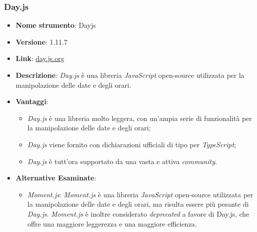 \subsubsection{Day.js}
\begin{itemize}
    \item \textbf{Nome strumento}: Dayjs
    \item \textbf{Versione}: 1.11.7
    \item \textbf{Link}: \href{https://day.js.org/}{day.js.org}
    \item \textbf{Descrizione}: \textit{Day.js} è una libreria \textit{JavaScript} open-source utilizzata per la manipolazione delle date e degli orari.
    \item \textbf{Vantaggi}:
          \begin{itemize}
              \item \textit{Day.js} è una libreria molto leggera, con un'ampia serie di funzionalità per la manipolazione delle date e degli orari;
              \item \textit{Day.js} viene fornito con dichiarazioni ufficiali di tipo per \textit{TypeScript};
              \item \textit{Day.js} è tutt'ora supportato da una vasta e attiva \textit{community}.
          \end{itemize}
    \item \textbf{Alternative Esaminate}:
          \begin{itemize}
              \item \textit{Moment.js}: \textit{Moment.js} è una libreria \textit{JavaScript} open-source utilizzata per la manipolazione delle date e degli orari, ma risulta essere più pesante
                    di \textit{Day.js}. \textit{Moment.js} è inoltre considerato \textit{deprecated} a favore di Day.js, che offre una maggiore leggerezza e una maggiore efficienza.
          \end{itemize}
\end{itemize}

